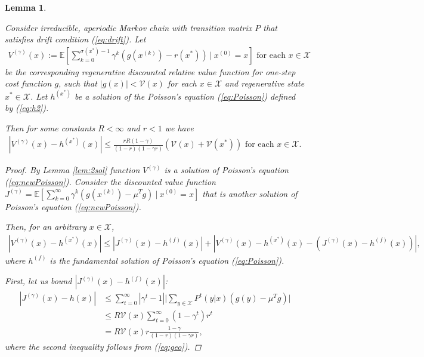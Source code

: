 \documentclass[11pt]{article}
\newcommand{\E}{\mathbb{E}}
\newcommand{\X}{\mathcal{X}}
\newcommand{\V}{\mathcal{V}}
\newtheorem{lemma}{Lemma}
\theoremstyle{definition}
\numberwithin{equation}{section}
\begin{document}
\begin{lemma}\label{lem:disc}

Consider  irreducible, aperiodic   Markov chain  with transition matrix $P$ that satisfies drift condition (\ref{eq:drift}).
Let \begin{align*}
 V^{(\gamma )}(x):=\E\left[ \sum\limits_{k=0}^{\sigma(x^*)-1} \gamma^k\left(g (x^{(k)} )-r(x^*)\right )~|~x^{(0)}=x \right] \text{ for each }x\in \X
\end{align*}
 be the corresponding   regenerative discounted relative value function for one-step cost function $g$,  such that  $|g(x)|<\V(x)$ for each $x\in \X$ and  regenerative state $x^*\in \X$. Let $h^{(x^*)} $ be a solution of the Poisson's equation (\ref{eq:Poisson}) defined by (\ref{eq:h2}).

 Then for some constants $R<\infty$ and $r<1$ we have
\begin{align*}
\left|V^{(\gamma)}(x) - h^{(x^*)}(x) \right|\leq \frac{rR(1-\gamma)}{(1-r)(1-\gamma r)}(\V(x)+\V(x^*)) \text{ for each }x\in \X.
\end{align*}


\begin{proof}
By Lemma \ref{lem:2sol} function $ V^{(\gamma )}$ is a solution of Poisson's equation (\ref{eq:newPoisson}). Consider the discounted value function  $J^{(  \gamma)}  = \E\left[ \sum\limits_{k=0}^{\infty} \gamma^k\left(g\left(x^{(k)}\right)- \mu^Tg \right)~|~x^{(0)}=x \right] $ that is another solution of Poisson's equation (\ref{eq:newPoisson}).

Then, for an arbitrary $x\in \X$,
\begin{align}\label{eq:VJ}
\left|V^{(\gamma)}(x) - h^{(x^*)}(x)\right| \leq \left|J^{(\gamma)}(x) - h^{(f)}(x)\right| + \left|V^{(\gamma)}(x) - h^{(x^*)}(x)  - \left(J^{(\gamma)}(x) - h^{(f)}(x)\right)\right|,
\end{align}
where $h^{(f)}$ is the fundamental solution of Poisson's equation (\ref{eq:Poisson}).

First, let us bound $\left|J^{(\gamma)}(x) - h^{(f)}(x)\right|$:
\begin{align*}
|J^{(\gamma)}(x) - h(x) | &\leq \sum\limits_{t=0}^\infty |\gamma^{t} - 1| \Big| \sum\limits_{y\in \X} P^t(y|x) (g(y) - \mu^T g)   \Big| \\
&\leq R \V(x) \sum\limits_{t=0}^\infty (1  - \gamma^{t}) r^t\\
&= R\V(x)r\frac{1-\gamma}{(1-r)(1-\gamma r) },
\end{align*}
where the second inequality follows from (\ref{eq:geo}).


\end{proof}
\end{lemma}
\end{document}
